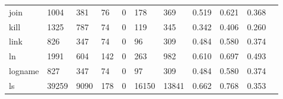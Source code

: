 \begin{longtable}{lp{1.2cm}p{1.2cm}p{1.2cm}p{1.2cm}p{1.2cm}p{1.2cm}p{1.2cm}p{1.2cm}p{1.2cm}p{1.2cm}}
join      &                                  1004 &                                                381 &                                               76 &                                               0 &                                              178 &                                            369 &                                              0.519 &                                              0.621 &                                              0.368 \\
kill      &                                  1325 &                                                787 &                                               74 &                                               0 &                                              119 &                                            345 &                                              0.342 &                                              0.406 &                                              0.260 \\
link      &                                   826 &                                                347 &                                               74 &                                               0 &                                               96 &                                            309 &                                              0.484 &                                              0.580 &                                              0.374 \\
ln        &                                  1991 &                                                604 &                                              142 &                                               0 &                                              263 &                                            982 &                                              0.610 &                                              0.697 &                                              0.493 \\
logname   &                                   827 &                                                347 &                                               74 &                                               0 &                                               97 &                                            309 &                                              0.484 &                                              0.580 &                                              0.374 \\
ls        &                                 39259 &                                               9090 &                                              178 &                                               0 &                                            16150 &                                          13841 &                                              0.662 &                                              0.768 &                                              0.353 \\

\end{longtable}
